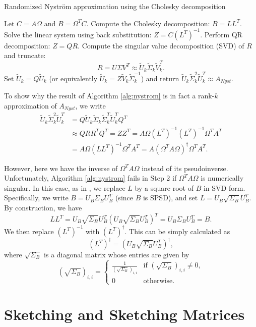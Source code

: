 \documentclass[a4paper, 12pt,oneside]{article}
\begin{document}
\begin{algorithm}
\caption{Randomized Nystr\"om approximation using the Cholesky decomposition}
\label{alg:nystrom}
\begin{algorithmic}[1]
  \State Let $C = A\Omega$ and $B = \Omega^T C$.
  \State Compute the Cholesky decomposition: $B = LL^T$.
  \State Solve the linear system using back substitution: $Z = C(L^T)^{-1}$.
  \State Perform QR decomposition: $Z = QR$.
  \State Compute the singular value decomposition (SVD) of $R$ and truncate:
  \[ R = U \Sigma V^T \approx \tilde{U}_k \tilde{\Sigma}_k \tilde{V}_k^T. \]
  \State Set $\tilde{U}_k = Q\tilde{U}_k$ (or equivalently $\tilde{U}_k = Z\tilde{V}_k\tilde{\Sigma}_k^{-1}$) and return $\tilde{U}_k \tilde{\Sigma}_k^2 \tilde{U}_k^T \approx A_{Nyst}$.
\end{algorithmic}
\end{algorithm}

To show why the result of Algorithm \ref{alg:nystrom} is in fact a rank-$k$ approximation of $A_{Nyst}$, we write
\begin{align*}
\tilde{U}_k \tilde{\Sigma}_k^2 \tilde{U}_k^T &= Q\tilde{U}_k \tilde{\Sigma}_k \tilde{\Sigma}_k^T \tilde{U}_k^T Q^T \\
&\approx QRR^T Q^T = ZZ^T = A\Omega(L^T)^{-1}(L^T)^{-1}\Omega^T A^T \\
&= A\Omega(LL^T)^{-1}\Omega^T A^T = A(\Omega^T A \Omega)^{\dagger}\Omega^T A^T.
\end{align*}

However, here we have the inverse of $\Omega^T A \Omega$ instead of its pseudoinverse. Unfortunately, Algorithm \ref{alg:nystrom} fails in Step 2 if $\Omega^T A \Omega$ is numerically singular. In this case, as in \cite{reference}, we replace $L$ by a square root of $B$ in SVD form. Specifically, we write $B = U_B \Sigma_B U_B^T$ (since $B$ is SPSD), and set $L = U_B \sqrt{\Sigma_B} U_B^T$. By construction, we have
\[
LL^T = U_B \sqrt{\Sigma_B} U_B^T (U_B \sqrt{\Sigma_B} U_B^T)^T = U_B \Sigma_B U_B^T = B.
\]
We then replace $(L^T)^{-1}$ with $(L^T)^\dagger$. This can be simply calculated as
\[
(L^T)^\dagger = (U_B \sqrt{\Sigma_B} U_B^T)^\dagger,
\]
where $\sqrt{\Sigma_B}$ is a diagonal matrix whose entries are given by
\[
(\sqrt{\Sigma_B})_{i,i} = \begin{cases} \frac{1}{(\sqrt{\Sigma_B})_{i,i}} & \text{if } (\sqrt{\Sigma_B})_{i,i} \neq 0, \\
0 & \text{otherwise.} \end{cases}
\]
\section{Sketching and Sketching Matrices}
\end{document}
